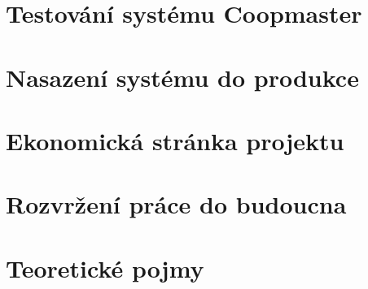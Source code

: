 \newpage
\chapter{Testování systému Coopmaster}\label{ch:testovani-systemu-coopmaster}
\textcolor{\textcolorname}{}

\newpage
\chapter{Nasazení systému do produkce}\label{ch:nasazeni-systemu-do-produkce}
\textcolor{\textcolorname}{}

\newpage
\chapter{Ekonomická stránka projektu}\label{ch:ekonomicka-stranka-projektu}
\textcolor{\textcolorname}{}

\newpage
\chapter{Rozvržení práce do budoucna}\label{ch:rozvrzeni-prace-do-budoucna}
\textcolor{\textcolorname}{}

\newpage
\chapter{Teoretické pojmy}\label{ch:teoreticke-pojmy}
\textcolor{\textcolorname}{}






